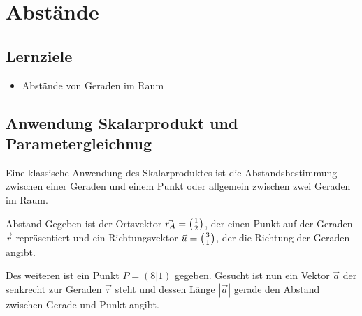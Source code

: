 \section{Abstände}

\subsection*{Lernziele}
\begin{itemize}
\item Abstände von Geraden im Raum
\end{itemize}

\subsection{Anwendung Skalarprodukt und Parametergleichnug}

Eine klassische Anwendung des Skalarproduktes ist die
Abstandsbestimmung zwischen einer Geraden und einem Punkt oder
allgemein zwischen zwei Geraden im Raum.

\begin{beispiel}{Abstand}{}
Gegeben ist der Ortsvektor $\vec{r_A}=\left(1 \atop 2\right)$, der einen Punkt auf der
Geraden $\vec{r}$ repräsentiert und ein Richtungsvektor
$\vec{u}=\left(3\atop 1\right)$, der
die Richtung der Geraden angibt.

Des weiteren ist ein Punkt $P=(8|1)$ gegeben. Gesucht ist nun ein Vektor
$\vec{a}$ der senkrecht zur Geraden $\vec{r}$ steht und dessen Länge
$|\vec{a}|$ gerade den Abstand zwischen Gerade und Punkt angibt.
\end{beispiel}



